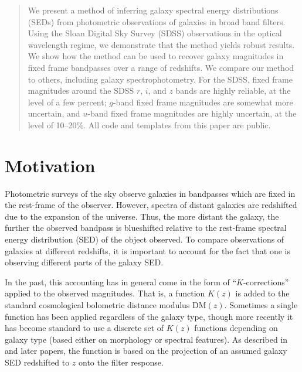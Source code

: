 \documentclass[10pt,preprint]{aastex}
\begin{document}
\begin{abstract}
We present a method of inferring galaxy spectral energy distributions
(SEDs) from photometric observations of galaxies in broad band
filters. Using the Sloan Digital Sky Survey (SDSS) observations in the
optical wavelength regime, we demonstrate that the method yields
robust results. We show how the method can be used to recover galaxy
magnitudes in fixed frame bandpasses over a range of redshifts. We
compare our method to others, including galaxy spectrophotometry. For
the SDSS, fixed frame magnitudes around the SDSS $r$, $i$, and $z$
bands are highly reliable, at the level of a few percent; $g$-band
fixed frame magnitudes are somewhat more uncertain, and $u$-band fixed
frame magnitudes are highly uncertain, at the level of 10--20\%. All
code and templates from this paper are public.
\end{abstract}


%
%

\section{Motivation}
\label{motivation}

Photometric surveys of the sky observe galaxies in bandpasses which
are fixed in the rest-frame of the observer. However, spectra of
distant galaxies are redshifted due to the expansion of the
universe. Thus, the more distant the galaxy, the further the observed
bandpass is blueshifted relative to the rest-frame spectral energy
distribution (SED) of the object observed. To compare observations of
galaxies at different redshifts, it is important to account for the
fact that one is observing different parts of the galaxy SED.

In the past, this accounting has in general come in the form of
``$K$-corrections'' applied to the observed magnitudes. That is, a
function $K(z)$ is added to the standard cosmological bolometric
distance modulus $\mathrm{DM}(z)$. Sometimes a single function has
been applied regardless of the galaxy type, though more recently it
has become standard to use a discrete set of $K(z)$ functions
depending on galaxy type (based either on morphology or spectral
features). As described in \cite{oke68a} and later papers, the
function is based on the projection of an assumed galaxy SED
redshifted to $z$ onto the filter response.
\end{document}
